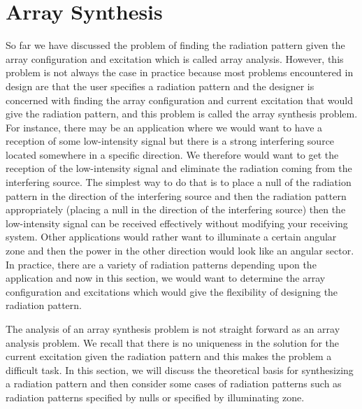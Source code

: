 \chapter{Array Synthesis}
So far we have discussed the problem of finding the radiation pattern given the array configuration and excitation which is called array analysis. However, this problem is not always the case in practice because most problems encountered in design are that the user specifies a radiation pattern and the designer is concerned with finding the array configuration and current excitation that would give the radiation pattern, and this problem is called the array synthesis problem. For instance, there may be an application where we would want to have a reception of some low-intensity signal but there is a strong interfering source located somewhere in a specific direction. We therefore would want to get the reception of the low-intensity signal and eliminate the radiation coming from the interfering source. The simplest way to do that is to place a null of the radiation pattern in the direction of the interfering source and then the radiation pattern appropriately (placing a null in the direction of the interfering source) then the low-intensity signal can be received effectively without modifying your receiving system. Other applications would rather want to illuminate a certain angular zone and then the power in the other direction would look like an angular sector. In practice, there are a variety of radiation patterns depending upon the application and now in this section, we would want to determine the array configuration and excitations which would give the flexibility of designing the radiation pattern.

The analysis of an array synthesis problem is not straight forward as an array analysis problem. We recall that there is no uniqueness in the solution for the current excitation given the radiation pattern and this makes the problem a difficult task. In this section, we will discuss the theoretical basis for synthesizing a radiation pattern and then consider some cases of radiation patterns such as radiation patterns specified by nulls or specified by illuminating zone.


